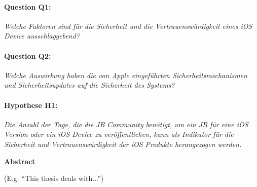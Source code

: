 \paragraph{Question Q1:} \textit{\glqq Welche Faktoren sind für die Sicherheit und die Vertrauenswürdigkeit eines iOS Device ausschlaggebend?\grqq{}}
\paragraph{Question Q2:} \textit{\glqq Welche Auswirkung haben die von Apple eingeführten Sicherheitsmechanismen und Sicherheitsupdates auf die Sicherheit des Systems?\grqq{}}        
\paragraph{Hypothese H1:}\textit{\glqq Die Anzahl der Tage, die die JB Community benötigt, um ein JB für eine iOS Version oder ein iOS Device zu veröffentlichen, kann als Indikator für die Sicherheit und Vertrauenswürdigkeit der iOS Produkte herangezogen werden.\grqq{}}




\cleardoublepage


\begin{center}
{\Large\bfseries Abstract}
\end{center}

(E.g. ``This thesis deals with...'')

